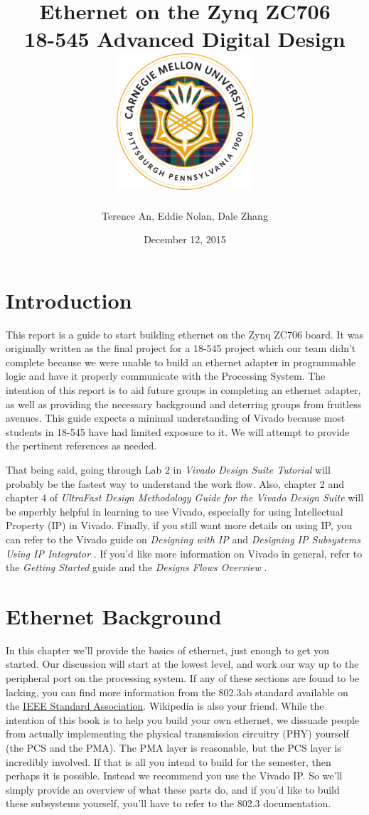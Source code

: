 \documentclass[12pt]{report}
\title{
  {Ethernet on the Zynq ZC706 \vspace{0.2in}}\\
  {\large 18-545 Advanced Digital Design \vspace{0.2in}}\\
  {\includegraphics[width=2in]{cmu_seal.png}}
}
\author{Terence An, Eddie Nolan, Dale Zhang}
\date{December 12, 2015}
\begin{document}
\maketitle

\tableofcontents

\chapter{Introduction}
This report is a guide to start building ethernet on the Zynq ZC706 board. It was originally written as the final project for a 18-545 project which our team didn't complete because we were unable to build an ethernet adapter in programmable logic and have it properly communicate with the Processing System. The intention of this report is to aid future groups in completing an ethernet adapter, as well as providing the necessary background and deterring groups from fruitless avenues. This guide expects a minimal understanding of Vivado because most students in 18-545 have had limited exposure to it. We will attempt to provide the pertinent references as needed.

That being said, going through Lab 2 in \textit{Vivado Design Suite Tutorial} \cite{vivado_tut} will probably be the fastest way to understand the work flow. Also, chapter 2 and chapter 4 of \textit{UltraFast Design Methodology Guide for the Vivado Design Suite} \cite{ultrafast} will be superbly helpful in learning to use Vivado, especially for using Intellectual Property (IP) in Vivado. Finally, if you still want more details on using IP, you can refer to the Vivado guide on \textit{Designing with IP} \cite{IP} and \textit{Designing IP Subsystems Using IP Integrator} \cite{IP_subsystems}. If you'd like more information on Vivado in general, refer to the \textit{Getting Started} \cite{starter} guide and the \textit{Designs Flows Overview} \cite{design_flows}.

\chapter{Ethernet Background}
In this chapter we'll provide the basics of ethernet, just enough to get you started.
Our discussion will start at the lowest level, and work our way up to the peripheral port on the processing system. If any of these sections are found to be lacking, you can find more information from the 802.3ab standard available on the \href{http://standards.ieee.org/about/get/802/802.3.html}{IEEE Standard Association}. Wikipedia is also your friend.
While the intention of this book is to help you build your own ethernet,
we dissuade people from actually implementing the physical transmission circuitry (PHY) yourself (the PCS and the PMA). The PMA layer is reasonable, but the PCS layer is incredibly involved. If that is all you intend to build for the semester, then perhaps it is possible. Instead we recommend you use the Vivado IP. So we'll simply provide an overview of what these parts do, and if you'd like to build these subsystems yourself, you'll have to refer to the 802.3 documentation.
\end{document}
